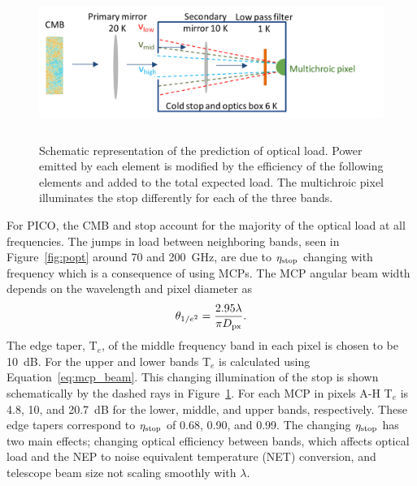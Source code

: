 \documentclass[]{spie}  %
\newcommand{\comr}[1]{\textcolor{red}{#1}}
\begin{document}
\begin{figure} [ht]
\begin{center}
\hspace{1cm} \includegraphics[height=5cm]{load_calc_MCP.png}
\end{center}
\caption[load] { \label{fig:load} 
Schematic representation of the prediction of optical load.  Power emitted by each element is modified by the efficiency of 
the following elements and added to the total expected load.  The multichroic pixel illuminates the stop differently for 
each of the three bands. }
\end{figure} 
%

For PICO, the CMB and stop account for the majority of the optical load at all frequencies. 
The jumps in load between neighboring bands, seen in Figure~\ref{fig:popt} around 70 and 200~GHz, are 
due to $\eta_{\rm stop}$ changing with frequency which is a consequence of using MCPs.  
The MCP angular beam width depends on the wavelength and pixel diameter as\cite{suzuki2013_thesis}
\begin{equation}
\label{eq:mcp_beam}
\theta_{1/e^2} = \frac{2.95 \lambda}{\pi D_{\rm px}}. 
\end{equation} 
The edge taper, T$_e$, of the middle frequency band in each pixel is chosen to be 10~dB. For the upper and lower bands 
T$_e$ is calculated using Equation~\ref{eq:mcp_beam}. This changing illumination of the stop is shown schematically by 
the dashed rays in Figure~\ref{fig:load}. 
For each MCP in pixels A-H T$_e$ is 4.8, 10, and 20.7~dB for the lower, middle, and upper bands, respectively.  These 
edge tapers correspond to $\eta_{\rm stop}$ of 0.68, 0.90, and 0.99.
The changing $\eta_{\rm stop}$ has two main effects; changing optical efficiency between bands, which affects optical load 
and the NEP to noise equivalent temperature (NET) conversion, and telescope beam size not scaling smoothly with $\lambda$.
\end{document}
